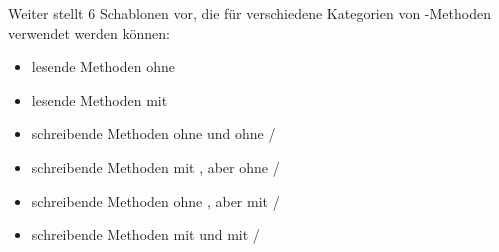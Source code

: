 \noindent
Weiter stellt \cite[138 ff.]{Oec22} 6 Schablonen vor, die für verschiedene Kategorien von -Methoden verwendet werden können:

\begin{itemize}
    \item lesende Methoden ohne 
    \item lesende Methoden mit 
    \item schreibende Methoden ohne  und ohne /
    \item schreibende Methoden mit , aber ohne /
    \item schreibende Methoden ohne , aber mit /
    \item schreibende Methoden mit  und mit /
\end{itemize}
